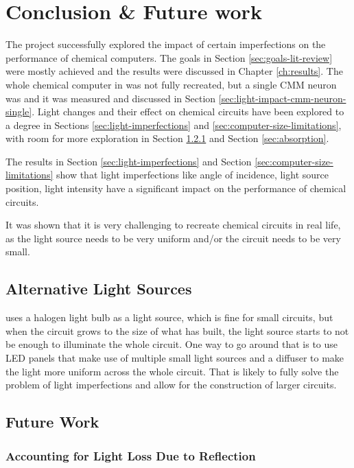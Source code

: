 \chapter{Conclusion \& Future work}
The project successfully explored the impact of certain imperfections on the performance of chemical computers.
The goals in Section \ref{sec:goals-lit-review} were mostly achieved and the results were discussed in Chapter \ref{ch:results}.
The whole chemical computer in \cite{stovold2017reaction} was not fully recreated, but a single CMM neuron was and it was measured and discussed in Section \ref{sec:light-impact-cmm-neuron-single}.
Light changes and their effect on chemical circuits have been explored to a degree in Sections \ref{sec:light-imperfections} and \ref{sec:computer-size-limitations}, with room 
for more exploration in Section \ref{sec:reflection-refraction} and Section \ref{sec:absorption}.

The results in Section \ref{sec:light-imperfections} and Section \ref{sec:computer-size-limitations} show that light imperfections like 
angle of incidence, light source position, light intensity have a significant impact on the performance of chemical circuits.

It was shown that it is very challenging to recreate chemical circuits in real life, as the light source needs to be very uniform and/or the circuit needs to be very small.

\section{Alternative Light Sources}
\cite{gorecki2003chemical} uses a halogen light bulb as a light source, which is fine for small circuits, but when the circuit grows to the size 
of what \cite{stovold2017reaction} has built, the light source starts to not be enough to illuminate the whole circuit.
One way to go around that is to use LED panels that make use of multiple small light sources and a diffuser to make the light more uniform across the whole circuit.
That is likely to fully solve the problem of light imperfections and allow for the construction of larger circuits.

\section{Future Work}

\subsection{Accounting for Light Loss Due to Reflection} \label{sec:reflection-refraction}

